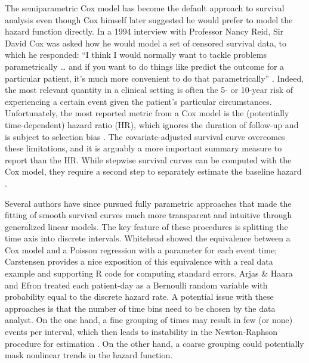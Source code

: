 The semiparametric Cox model has become the default approach to survival
analysis even though Cox himself later suggested he would prefer to
model the hazard function directly. In a 1994 interview with Professor
Nancy Reid, Sir David Cox was asked how he would model a set of censored
survival data, to which he responded: ``I think I would normally want to
tackle problems parametrically \ldots{} and if you want to do things
like predict the outcome for a particular patient, it's much more
convenient to do that parametrically'' \citep{reid1994conversation}.
Indeed, the most relevant quantity in a clinical setting is often the 5-
or 10-year risk of experiencing a certain event given the patient's
particular circumstances. Unfortunately, the most reported metric from a
Cox model is the (potentially time-dependent) hazard ratio (HR), which
ignores the duration of follow-up and is subject to selection bias
\citep{hernan2010hazards}. The covariate-adjusted survival curve
overcomes these limitations, and it is arguably a more important summary
measure to report than the HR. While stepwise survival curves can be
computed with the Cox model, they require a second step to separately
estimate the baseline hazard \citep{breslow1972discussion}.

Several authors have since pursued fully parametric approaches that made
the fitting of smooth survival curves much more transparent and
intuitive through generalized linear models. The key feature of these
procedures is splitting the time axis into discrete intervals. Whitehead
\citeyearpar{whitehead1980fitting} showed the equivalence between a Cox
model and a Poisson regression with a parameter for each event time;
Carstensen \citeyearpar{copenhagen2012needs} provides a nice exposition
of this equivalence with a real data example and supporting R code for
computing standard errors. Arjas \& Haara
\citeyearpar{arjas1987logistic} and Efron
\citeyearpar{efron1988logistic} treated each patient-day as a Bernoulli
random variable with probability equal to the discrete hazard rate. A
potential issue with these approaches is that the number of time bins
need to be chosen by the data analyst. On the one hand, a fine grouping
of times may result in few (or none) events per interval, which then
leads to instability in the Newton-Raphson procedure for estimation
\citep{kalbfleisch2011statistical}. On the other hand, a coarse grouping
could potentially mask nonlinear trends in the hazard function.

